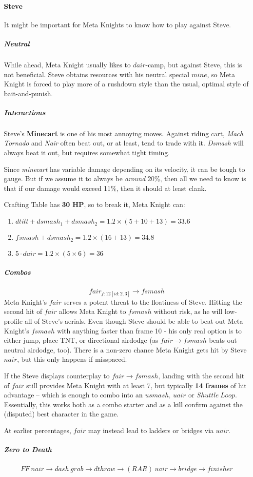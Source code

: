 \paragraph{Steve}

It might be important for Meta Knights to know how to play against Steve.

\subparagraph{Neutral}
While ahead, Meta Knight usually likes to $dair$-camp, but against Steve, this is not beneficial. Steve obtains resources with his neutral special $mine$, so Meta Knight is forced to play more of a rushdown style than the usual, optimal style of bait-and-punish.

\subparagraph{Interactions}

Steve's \textbf{Minecart} is one of his most annoying moves. Against riding cart, \textit{Mach Tornado} and \textit{Nair} often beat out, or at least, tend to trade with it. \textit{Dsmash} will always beat it out, but requires somewhat tight timing.

Since \textit{minecart} has variable damage depending on its velocity, it can be tough to gauge. But if we assume it to always be \textit{around} 20\%, then all we need to know is that if our damage would exceed 11\%, then it should at least clank.

Crafting Table has \textbf{30 HP}, so to break it, Meta Knight can:
\begin{enumerate}[label = \roman*.]
	\item $dtilt + dsmash_1 + dsmash_2 = 1.2 \times (5 + 10 + 13) = 33.6$
	\item $fsmash + dsmash_2 = 1.2 \times (16 + 13) = 34.8$
	\item $5 \cdot dair = 1.2 \times (5 \times 6) = 36$
\end{enumerate}

\subparagraph{Combos}
\[fair_{f:12[id : 2,3]} \to fsmash\]
Meta Knight's $fair$ serves a potent threat to the floatiness of Steve.
Hitting the second hit of $fair$ allows Meta Knight to $fsmash$ without risk, as he will low-profile all of Steve's aerials. Even though Steve should be able to beat out Meta Knight's $fsmash$ with anything faster than frame 10 - his only real option is to either jump, place TNT, or directional airdodge (as $fair \to fsmash$ beats out neutral airdodge, too). There is a non-zero chance Meta Knight gets hit by Steve $nair$, but this only happens if misspaced.

If the Steve displays counterplay to $fair \to fsmash$, landing with the second hit of $fair$ still provides Meta Knight with at least 7, but typically \textbf{14 frames} of hit advantage -- which is enough to combo into an $usmash$, $uair$ or $Shuttle\ Loop$. Essentially, this works both as a combo starter and as a kill confirm against the (disputed) best character in the game.

At earlier percentages, $fair$ may instead lead to ladders or bridges via $uair$.

\subparagraph{Zero to Death}
\[
	FF\ nair \to dash\ grab \to dthrow \to (RAR)\ uair
		\to bridge
		\to finisher
\]